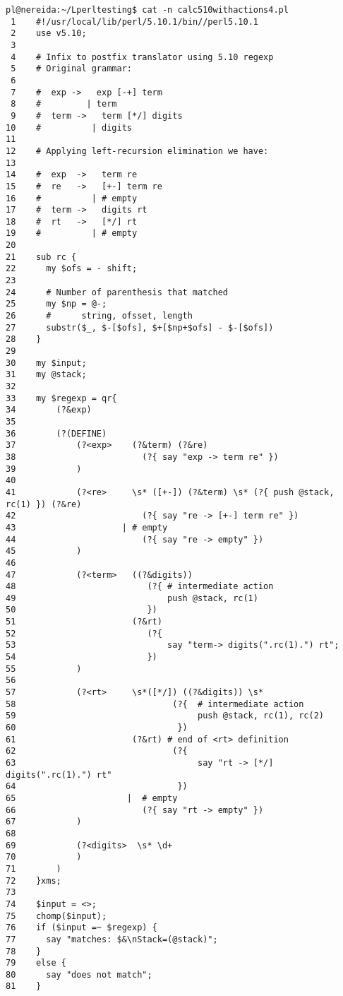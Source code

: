 \begin{latexonly}
\begin{verbatim}
pl@nereida:~/Lperltesting$ cat -n calc510withactions4.pl
 1    #!/usr/local/lib/perl/5.10.1/bin//perl5.10.1
 2    use v5.10;
 3  
 4    # Infix to postfix translator using 5.10 regexp
 5    # Original grammar:
 6  
 7    #  exp ->   exp [-+] term
 8    #         | term
 9    #  term ->   term [*/] digits
10    #          | digits
11  
12    # Applying left-recursion elimination we have:
13  
14    #  exp  ->   term re
15    #  re   ->   [+-] term re
16    #          | # empty
17    #  term ->   digits rt
18    #  rt   ->   [*/] rt
19    #          | # empty
20  
21    sub rc {
22      my $ofs = - shift;
23  
24      # Number of parenthesis that matched
25      my $np = @-;
26      #      string, ofsset, length
27      substr($_, $-[$ofs], $+[$np+$ofs] - $-[$ofs])
28    }
29  
30    my $input;
31    my @stack;
32  
33    my $regexp = qr{
34        (?&exp)
35  
36        (?(DEFINE)
37            (?<exp>    (?&term) (?&re)
38                         (?{ say "exp -> term re" })
39            )
40  
41            (?<re>     \s* ([+-]) (?&term) \s* (?{ push @stack, rc(1) }) (?&re)
42                         (?{ say "re -> [+-] term re" })
43                     | # empty
44                         (?{ say "re -> empty" })
45            )
46  
47            (?<term>   ((?&digits))
48                          (?{ # intermediate action
49                              push @stack, rc(1)
50                          })
51                       (?&rt)
52                          (?{
53                              say "term-> digits(".rc(1).") rt";
54                          })
55            )
56  
57            (?<rt>     \s*([*/]) ((?&digits)) \s*
58                               (?{  # intermediate action
59                                    push @stack, rc(1), rc(2)
60                                })
61                       (?&rt) # end of <rt> definition
62                               (?{
63                                    say "rt -> [*/] digits(".rc(1).") rt"
64                                })
65                      |  # empty
66                         (?{ say "rt -> empty" })
67            )
68  
69            (?<digits>  \s* \d+
70            )
71        )
72    }xms;
73  
74    $input = <>;
75    chomp($input);
76    if ($input =~ $regexp) {
77      say "matches: $&\nStack=(@stack)";
78    }
79    else {
80      say "does not match";
81    }
\end{verbatim}
\end{latexonly}
